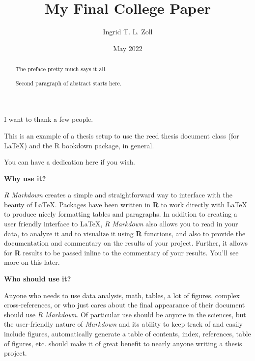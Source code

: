 \documentclass[12pt,twoside]{reedthesis}
\title{My Final College Paper}
\author{Ingrid T. L. Zoll}
\date{May 2022}
\begin{document}
  \maketitle

\frontmatter %
\pagestyle{empty} %
  \begin{acknowledgements}
    I want to thank a few people.
  \end{acknowledgements}
  \begin{preface}
    This is an example of a thesis setup to use the reed thesis document class
    (for LaTeX) and the R bookdown package, in general.
  \end{preface}
  \hypersetup{linkcolor=black}
  \setcounter{secnumdepth}{2}
  \setcounter{tocdepth}{2}
  \tableofcontents

  \listoftables

  \listoffigures
  \begin{abstract}
    The preface pretty much says it all.

    \par

    Second paragraph of abstract starts here.
  \end{abstract}
  \begin{dedication}
    You can have a dedication here if you wish.
  \end{dedication}
\mainmatter %
\pagestyle{fancyplain} %

\textbf{Why use it?}

\emph{R Markdown} creates a simple and straightforward way to interface with the beauty of LaTeX. Packages have been written in \textbf{R} to work directly with LaTeX to produce nicely formatting tables and paragraphs. In addition to creating a user friendly interface to LaTeX, \emph{R Markdown} also allows you to read in your data, to analyze it and to visualize it using \textbf{R} functions, and also to provide the documentation and commentary on the results of your project. Further, it allows for \textbf{R} results to be passed inline to the commentary of your results. You'll see more on this later.

\textbf{Who should use it?}

Anyone who needs to use data analysis, math, tables, a lot of figures, complex cross-references, or who just cares about the final appearance of their document should use \emph{R Markdown}. Of particular use should be anyone in the sciences, but the user-friendly nature of \emph{Markdown} and its ability to keep track of and easily include figures, automatically generate a table of contents, index, references, table of figures, etc. should make it of great benefit to nearly anyone writing a thesis project.
\end{document}
